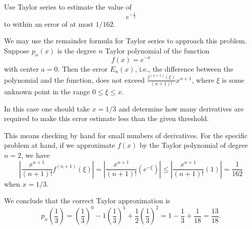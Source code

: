 \documentclass{ximera}
\begin{document}
\begin{question}%

Use Taylor series to estimate the value of
\[e^{-\frac{1}{3}}\] to within an error of at most \(1/162\).
\begin{multiplechoice}
\end{multiplechoice}
\begin{feedback}
We may use the remainder formula for Taylor series to approach this problem.
Suppose \(p_n(x)\) is the degree \(n\) Taylor polynomial of the function
\[ f(x) = e^{-x}\]
with center \(a=0\). Then the error \(E_n(x)\), i.e., the difference between the polynomial and the function, does not exceed \(\frac{f^{(n+1)}(\xi)}{(n+1)!}x^{n+1}\), where \(\xi\) is some unknown point  in the range \(0 \leq \xi \leq x\). \begin{hint}  In this case one should take \(x = 1/3\) and determine how many derivatives are required to make this error estimate less than the given threshold. \begin{hint} This means checking by hand for small numbers of derivatives. For the specific problem at hand, if we approximate \(f(x)\) by the Taylor polynomial of degree \( n = 2\), we have 
\[ \left| \frac{x^{n+1} }{(n+1)!} f^{(n+1)}(\xi) \right| = \left| \frac{x^{n+1}}{(n+1)!} \left( e^{-\xi} \right) \right| \leq \left| \frac{x^{n+1}}{(n+1)!} \left( 1 \right) \right| = \frac{1}{162} \] when \(x = 1/3\). \begin{hint}
We conclude that the correct Taylor approximation is
\[ p_n \left( \frac{1}{3}\right) =  \left(\frac{1}{3}\right)^{0} -1\left(\frac{1}{3}\right)^{1} + \frac{1}{2}\left(\frac{1}{3}\right)^{2} =  1 -\frac{1}{3} + \frac{1}{18} = \frac{13}{18}.\] \end{hint} \end{hint} \end{hint}
\end{feedback}

\end{question}
\end{document}
